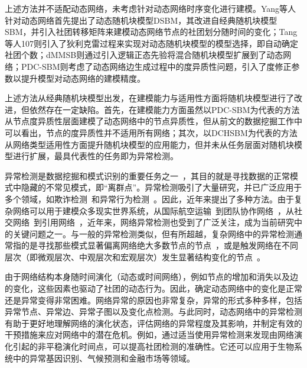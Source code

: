 上述方法并不适配动态网络，未考虑针对动态网络时序变化进行建模。Yang等人针对动态网络首先提出了动态随机块模型DSBM\cite{yang2011detecting}，其改进自经典随机块模型SBM，并引入社团转移矩阵来建模动态网络节点的社团划分随时间的变化；Tang等人107则引入了狄利克雷过程来实现对动态随机块模型的模型选择，即自动确定社团个数；dMMSB\cite{xing2010state}则通过引入逻辑正态先验将混合随机块模型扩展到了动态网络；PDC-SBM\cite{riverain2023poisson}则考虑了动态网络边生成过程中的度异质性问题，引入了度修正参数以提升模型对动态网络的建模精度。

上述方法从经典随机块模型出发，在建模能力与适用性方面将随机块模型进行了改进，但依然存在一定缺陷。首先，在建模能力方面虽然以PDC-SBM为代表的方法从节点度异质性层面建模了动态网络中的节点异质性，但从前文的数据挖掘工作中可以看出，节点的度异质性并不适用所有网络；其次，以DCHSBM为代表的方法从网络类型适用性方面提升随机块模型的应用能力，但并未从任务层面对随机块模型进行扩展，最具代表性的任务即为异常检测。


异常检测是数据挖掘和模式识别的重要任务之一~\cite{chandola2009anomaly,he2024diffusion}，其目的就是寻找数据的正常模式中隐藏的不常见模式，即“离群点”。异常检测吸引了大量研究，并已广泛应用于多个领域，如欺诈检测~\cite{ahmed2016survey}和异常行为检测~\cite{amraee2018anomaly}。因此，近年来提出了多种方法。由于复杂网络可以用于建模众多现实世界系统，从国际航空运输~\cite{kasai2016network}到团队协作网络~\cite{dai2024gated}，从社交网络~\cite{singh2024social}到引用网络~\cite{yan2024modeling}，近年来，网络异常检测也受到了广泛关注，成为当前研究中的关键问题之一。与一般的异常检测类似，但有所超越，复杂网络中的异常检测通常指的是寻找那些模式显著偏离网络绝大多数节点的节点~\cite{lim2024future,li2024unsupervised}，或是触发网络在不同层次（即微观层次、中观层次和宏观层次）发生显著结构变化的节点~\cite{hayat2024deep}。



由于网络结构本身随时间演化（动态或时间网络）\cite{huang2015triadic}，例如节点的增加和消失以及边的变化，这些因素也驱动了社团的动态行为。因此，确定动态网络中的变化是正常还是异常变得非常困难。网络异常的原因也非常复杂，异常的形式多种多样，包括异常节点、异常边、异常子图以及变化点检测\cite{ranshous2015anomaly}。与此同时，动态网络中的异常检测有助于更好地理解网络的演化状态，评估网络的异常程度及其影响，并制定有效的干预措施来应对网络中的潜在危机。例如，通过适当使用异常检测来发现由网络演化引起的非平稳演化时间点，可以提高社团检测的准确性。它还可以应用于生物系统中的异常基因识别、气候预测和金融市场等领域。


